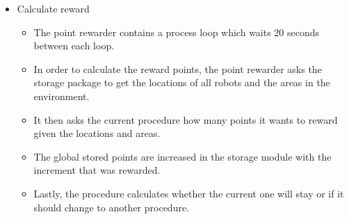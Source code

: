 \begin{itemize}
\begin{itemize}
       \end{itemize}
    \item Calculate reward
       \begin{itemize}
           \item The point rewarder contains a process loop which waits 20 seconds between each loop.
           \item In order to calculate the reward points, the point rewarder asks the storage package to get the locations of all robots and the areas in the environment.
           \item It then asks the current procedure how many points it wants to reward given the locations and areas.
           \item The global stored points are increased in the storage module with the increment that was rewarded.
           \item Lastly, the procedure calculates whether the current one will stay or if it should change to another procedure.
       \end{itemize}
\end{itemize}

